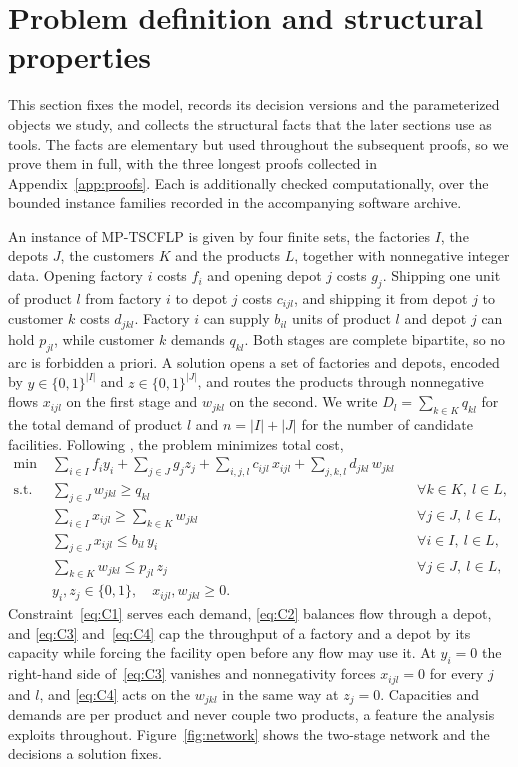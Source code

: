 \section{Problem definition and structural properties}\label{sec:prelim}

This section fixes the model, records its decision versions and the
parameterized objects we study, and collects the structural facts that
the later sections use as tools. The facts are elementary but used
throughout the subsequent proofs, so we prove them in full, with the
three longest proofs collected in Appendix~\ref{app:proofs}. Each is additionally checked
computationally, over the bounded instance families recorded in the
accompanying software archive.

An instance of MP-TSCFLP is given by four finite sets, the factories
$I$, the depots $J$, the customers $K$ and the products $L$, together
with nonnegative integer data. Opening factory $i$ costs $f_i$ and
opening depot $j$ costs $g_j$. Shipping one unit of product $l$ from
factory $i$ to depot $j$ costs $c_{ijl}$, and shipping it from depot $j$
to customer $k$ costs $d_{jkl}$. Factory $i$ can supply $b_{il}$ units of
product $l$ and depot $j$ can hold $p_{jl}$, while customer $k$ demands
$q_{kl}$. Both stages are complete bipartite, so no arc is forbidden a
priori. A solution opens a set of factories and depots, encoded by
$y\in\{0,1\}^{|I|}$ and $z\in\{0,1\}^{|J|}$, and routes the products through
nonnegative flows $x_{ijl}$ on the first stage and $w_{jkl}$ on the
second. We write $D_l=\sum_{k\in K}q_{kl}$ for the total demand of
product $l$ and $n=|I|+|J|$ for the number of candidate facilities.
Following \citet{MauriEtAl2021,PirkulJayaraman1998}, the problem
minimizes total cost,
\begin{align}
\min\;&\sum_{i\in I}f_iy_i+\sum_{j\in J}g_jz_j
      +\sum_{i,j,l}c_{ijl}\,x_{ijl}+\sum_{j,k,l}d_{jkl}\,w_{jkl}
\label{eq:obj}\\
\text{s.t.}\;
&\textstyle\sum_{j\in J}w_{jkl}\ge q_{kl}
   &&\forall k\in K,\ l\in L,\label{eq:C1}\\
&\textstyle\sum_{i\in I}x_{ijl}\ge\sum_{k\in K}w_{jkl}
   &&\forall j\in J,\ l\in L,\label{eq:C2}\\
&\textstyle\sum_{j\in J}x_{ijl}\le b_{il}\,y_i
   &&\forall i\in I,\ l\in L,\label{eq:C3}\\
&\textstyle\sum_{k\in K}w_{jkl}\le p_{jl}\,z_j
   &&\forall j\in J,\ l\in L,\label{eq:C4}\\
&y_i,z_j\in\{0,1\},\quad x_{ijl},w_{jkl}\ge 0.\label{eq:dom}
\end{align}
Constraint~\eqref{eq:C1} serves each demand, \eqref{eq:C2} balances flow
through a depot, and \eqref{eq:C3} and~\eqref{eq:C4} cap the throughput of
a factory and a depot by its capacity while forcing the facility open
before any flow may use it. At $y_i=0$ the right-hand side
of~\eqref{eq:C3} vanishes and nonnegativity forces $x_{ijl}=0$ for every
$j$ and $l$, and \eqref{eq:C4} acts on the $w_{jkl}$ in the same way at
$z_j=0$. Capacities and demands are per product and
never couple two products, a feature the analysis exploits throughout.
Figure~\ref{fig:network} shows the two-stage network and the decisions a
solution fixes.

